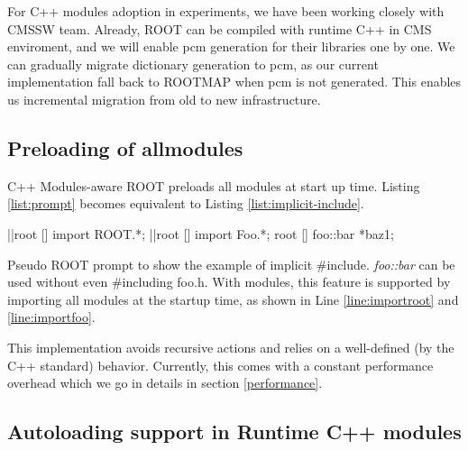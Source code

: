 \documentclass{webofc}
\begin{document}
For C++ modules adoption in experiments, we have been working closely with CMSSW team. Already, ROOT can be compiled with runtime C++ in CMS enviroment, and we will enable pcm generation for their libraries one by one. We can gradually migrate dictionary generation to pcm, as our current implementation fall back to ROOTMAP when pcm is not generated. This enables us incremental migration from old to new infrastructure.

\subsection{Preloading of allmodules}
\label{subsec:preloading}

C++ Modules-aware ROOT preloads all modules at start up time. Listing \ref{list:prompt} becomes equivalent to Listing \ref{list:implicit-include}.

\begin{listing}[h]
    \noindent
    \begin{minipage}[h]{.7\textwidth}
    \begin{cppcode*}{}
    |\label{line:importroot}|root [] import ROOT.*;
    |\label{line:importfoo}|root [] import Foo.*;
    root [] foo::bar *baz1;
    \end{cppcode*}
    \end{minipage}
    \caption{Pseudo ROOT prompt to show the example of implicit \#include. {\it foo::bar} can be used without even \#including foo.h. With modules, this feature is supported by importing all modules at the startup time, as shown in Line \ref{line:importroot} and \ref{line:importfoo}.}
    \label{list:implicit-include}
\end{listing}

This implementation avoids recursive actions and relies on a well-defined (by the C++ standard) behavior. Currently, this comes with a constant performance overhead which we go in details in section \ref{performance}.

\subsection{Autoloading support in Runtime C++ modules}
\label{subsec:autoloading}
\end{document}
